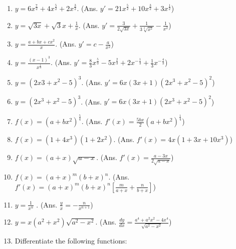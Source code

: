 \begin{enumerate}
\item
$y = 6x^{\frac{7}{2}} + 4x^{\frac{5}{2}} + 2x^{\frac{3}{2}}$.   
\qquad (Ans.	$	y' = 21x^{\frac{5}{2}} + 10x^{\frac{3}{2}} + 3x^{\frac{1}{2}}$)

\item
$y = \sqrt{3x} + \sqrt{3}{x} + \frac{1}{x}$. 
\qquad (Ans.	$	y' = \frac{3}{2\sqrt{3x}} + \frac{1}{3\sqrt[3]{x^2}} - \frac{1}{x^2}$)

\item
$y = \frac{a + bx + cx^2}{x}$. 	\qquad (Ans.	$y' = c - \frac{a}{x^2}$)

\item
$y = \frac{(x - 1)^3}{x^{\frac{1}{3}}}$.
 	\qquad (Ans.	$y' = \frac{8}{3}x^{\frac{5}{3}} - 5x^{\frac{2}{3}} 
+ 2x^{-\frac{1}{3}} + \frac{1}{3}x^{-\frac{4}{3}}$)

\item
$y = (2x3 + x^2 - 5)^3$. 	\qquad (Ans. $y' = 6x(3x + 1)(2x^3 + x^2 - 5)^2$)

\item
$y = (2x^3 + x^2 - 5)^3$. 	\qquad (Ans. 	$y' = 6x(3x + 1)(2x^3 + x^2 - 5)^2$)

\item
$f(x) = (a + bx^2)^{\frac{5}{4}}$. 
\qquad (Ans. 	$	f'(x) = \frac{5bx}{2}(a + bx^2)^{\frac{1}{4}}$)

\item
$ f(x) = (1 + 4x^3)(1 + 2x^2)$. 	
\qquad (Ans. $f'(x) = 4x(1 + 3x + 10x^3)$)

\item
$f(x) = (a + x)\sqrt{a - x}$. 	
\qquad (Ans. $f'(x) = \frac{a - 3x}{2\sqrt{a - x}}$)

\item
$f(x) = (a + x)^m(b + x)^n$. 	
\qquad (Ans. $f'(x) = (a + x)^m(b + x)^n \left [ \frac{m}{a + x} + \frac{n}{b + x} \right ]$)

\item
$y = \frac{1}{x^n}$ . \qquad (Ans. 	$\frac{y}{x} = -\frac{n}{x^{n + 1}}$)

\item
$y = x(a^2 + x^2)\sqrt{a^2 - x^2}$. 
\qquad (Ans. $\frac{dy}{dx} = \frac{a^4 + a^2x^2 - 4x^4}{\sqrt{a^2 - x^2}}$)

\item
Differentiate the following functions:


\end{enumerate}
